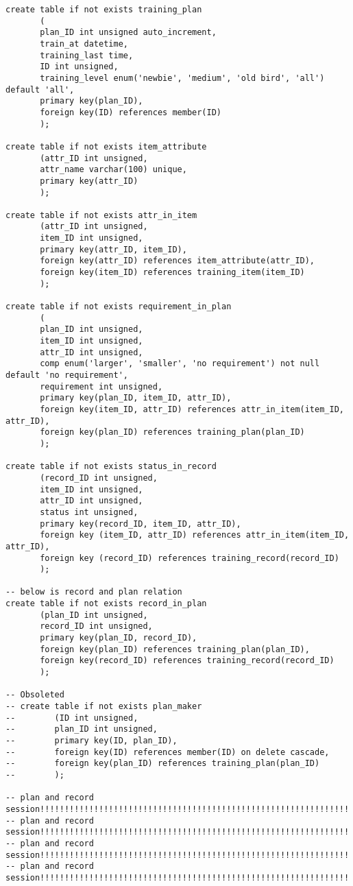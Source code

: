 \begin{Verbatim}[]
create table if not exists training_plan
       (
       plan_ID int unsigned auto_increment,
       train_at datetime,
       training_last time,
       ID int unsigned,
       training_level enum('newbie', 'medium', 'old bird', 'all') default 'all',
       primary key(plan_ID),
       foreign key(ID) references member(ID)
       );

create table if not exists item_attribute
       (attr_ID int unsigned,
       attr_name varchar(100) unique,
       primary key(attr_ID)
       );

create table if not exists attr_in_item
       (attr_ID int unsigned,
       item_ID int unsigned,
       primary key(attr_ID, item_ID),
       foreign key(attr_ID) references item_attribute(attr_ID),
       foreign key(item_ID) references training_item(item_ID)
       );

create table if not exists requirement_in_plan
       (
       plan_ID int unsigned,
       item_ID int unsigned,
       attr_ID int unsigned,
       comp enum('larger', 'smaller', 'no requirement') not null default 'no requirement',
       requirement int unsigned,
       primary key(plan_ID, item_ID, attr_ID),
       foreign key(item_ID, attr_ID) references attr_in_item(item_ID, attr_ID),
       foreign key(plan_ID) references training_plan(plan_ID)
       );

create table if not exists status_in_record
       (record_ID int unsigned,
       item_ID int unsigned,
       attr_ID int unsigned,
       status int unsigned,
       primary key(record_ID, item_ID, attr_ID),
       foreign key (item_ID, attr_ID) references attr_in_item(item_ID, attr_ID),
       foreign key (record_ID) references training_record(record_ID)
       );

-- below is record and plan relation
create table if not exists record_in_plan
       (plan_ID int unsigned,
       record_ID int unsigned,
       primary key(plan_ID, record_ID),
       foreign key(plan_ID) references training_plan(plan_ID),
       foreign key(record_ID) references training_record(record_ID)
       );

-- Obsoleted
-- create table if not exists plan_maker
--        (ID int unsigned,
--        plan_ID int unsigned,
--        primary key(ID, plan_ID),
--        foreign key(ID) references member(ID) on delete cascade,
--        foreign key(plan_ID) references training_plan(plan_ID)
--        );

-- plan and record session!!!!!!!!!!!!!!!!!!!!!!!!!!!!!!!!!!!!!!!!!!!!!!!!!!!!!!!!!!!!!!!!!!
-- plan and record session!!!!!!!!!!!!!!!!!!!!!!!!!!!!!!!!!!!!!!!!!!!!!!!!!!!!!!!!!!!!!!!!!!
-- plan and record session!!!!!!!!!!!!!!!!!!!!!!!!!!!!!!!!!!!!!!!!!!!!!!!!!!!!!!!!!!!!!!!!!!
-- plan and record session!!!!!!!!!!!!!!!!!!!!!!!!!!!!!!!!!!!!!!!!!!!!!!!!!!!!!!!!!!!!!!!!!!


\end{Verbatim}
